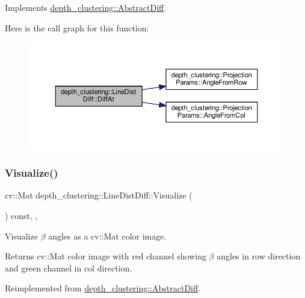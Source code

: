 Implements \hyperlink{classdepth__clustering_1_1AbstractDiff_a06ba188d8d83d0e4bad66c833656c26d}{depth\+\_\+clustering\+::\+Abstract\+Diff}.

Here is the call graph for this function\+:\nopagebreak
\begin{figure}[H]
\begin{center}
\leavevmode
\includegraphics[width=350pt]{classdepth__clustering_1_1LineDistDiff_a839eee44b14de26d85e6dbad5e37b356_cgraph}
\end{center}
\end{figure}
\mbox{\label{classdepth__clustering_1_1LineDistDiff_a7feaf820589ccfb47786d5124a74d725}} 
\subsubsection{\texorpdfstring{Visualize()}{Visualize()}}
{\footnotesize\ttfamily cv\+::\+Mat depth\+\_\+clustering\+::\+Line\+Dist\+Diff\+::\+Visualize (\begin{DoxyParamCaption}{ }\end{DoxyParamCaption}) const\hspace{0.3cm}{\ttfamily [inline]}, {\ttfamily [override]}, {\ttfamily [virtual]}}



Visualize $\beta$ angles as a {\ttfamily cv\+::\+Mat} color image. 

\begin{DoxyReturn}{Returns}
{\ttfamily cv\+::\+Mat} color image with red channel showing $\beta$ angles in row direction and green channel in col direction. 
\end{DoxyReturn}


Reimplemented from \hyperlink{classdepth__clustering_1_1AbstractDiff_a45314bf711f35e53590af28bdfc45313}{depth\+\_\+clustering\+::\+Abstract\+Diff}.

